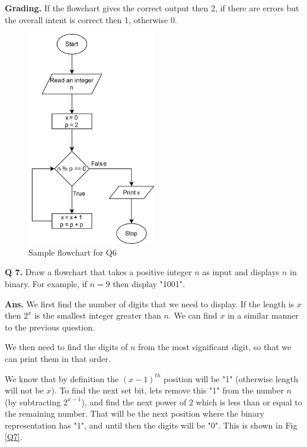 \documentclass{article}
\begin{document}
    \begin{flushleft}
    
    \textbf{Grading. } If the flowchart gives the correct output then 2, if there
    are errors but the overall intent is correct then 1, otherwise 0.
    
\end{flushleft}
    
    \begin{figure}[ht]
        \centering
        \includegraphics[width=0.5\textwidth]{Q6.png}
        \caption{Sample flowchart for Q6}
        \label{Q6}
    \end{figure}
    
\clearpage


\begin{flushleft}  

\textbf{Q 7. }  Draw a flowchart that takes a positive integer $n$ as input 
and displays $n$ in binary. For example, if $n = 9$ then display "1001".

\end{flushleft}

\begin{flushleft}

\textbf{Ans. } We first find the number of digits that we need to display. 
If the length is $x$ then $2^x$ is the smallest integer greater than $n$.
We can find $x$ in a similar manner to the previous question.

We then need to find the digits of $n$ from the most significant digit, so 
that we can print them in that order. 

We know that by definition the $(x-1)^{th}$ position will be "1" (otherwise 
length will not be $x$). To find the next set bit, lets remove this "1" from
the number $n$ (by subtracting $2^{x-1}$), and find the next power of $2$ which 
is less than or equal to the remaining number. That will be the next position 
where the binary representation has "1", and until then the digits will be "0".
This is shown in Fig \ref{Q7}.

\end{flushleft}
\end{document}
